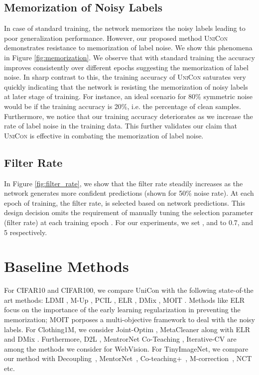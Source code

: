 \documentclass[10pt,twocolumn,letterpaper]{article}
\begin{document}
\subsection{Memorization of Noisy Labels}
In case of standard training, the network memorizes the noisy labels leading to poor generalization performance. However, our proposed method \textsc{UniCon} demonstrates resistance to memorization of label noise. We show this phenomena in Figure \ref{fig:memorization}. We observe that with standard training the accuracy improves consistently over different epochs suggesting the memorization of label noise. In sharp contrast to this, the training accuracy of \textsc{UniCon} saturates very quickly indicating that the network is resisting the memorization of noisy labels at later stage of training. For instance, an ideal scenario for 80\% symmetric noise would be if the training accuracy is 20\%, i.e. the percentage of clean samples. Furthermore, we notice that our training accuracy deteriorates as we increase the rate of label noise in the training data.  This further validates our claim that \textsc{UniCon} is effective in combating the memorization of label noise.  

\subsection{Filter Rate}
In Figure \ref{fig:filter_rate}, we show that the filter rate steadily increases as the network generates more confident predictions (shown for 50\% noise rate). At each epoch of training, the filter rate,  is selected based on network predictions. This design decision omits the requirement of manually tuning the selection parameter (filter rate) at each training epoch \cite{yao2021jo}.  For our experiments, we set , and  to 0.7, and 5 respectively.  

\section{Baseline Methods}
For CIFAR10 and CIFAR100, we compare UniCon with the following state-of-the art methods: LDMI \cite{xu2019ldmi}, M-Up \cite{zhang2018mixup}, PCIL \cite{yi2019probabilistic}, ELR \cite{liu2020earlylearning}, DMix \cite{li2020dividemix}, MOIT \cite{ortego2021multiobjective}. Methods like ELR \cite{liu2020earlylearning} focus on the importance of the early learning regularization in preventing the memorization; MOIT \cite{ortego2021multiobjective} porposes a multi-objective framework to deal with the noisy labels. 
For Clothing1M, we consider Joint-Optim \cite{tanaka2018joint}, MetaCleaner \cite{zhang2019metacleaner} along with ELR \cite{liu2020earlylearning} and DMix  \cite{li2020dividemix} . Furthermore, D2L \cite{ma2018dimensionality}, MentrorNet \cite{jiang2018mentornet} 
Co-Teaching \cite{han2018co}, Iterative-CV \cite{wang2018iterative} are among the methods we consider for WebVision. For TinyImageNet, we compare our method with Decoupling~\cite{malach2017decoupling},  MentorNet~\cite{jiang2018mentornet}, Co-teaching+~\cite{yu2019does}, M-correction~\cite{arazo2019unsupervised}, NCT \cite{sarfraz2020noisy} etc. 
\end{document}
